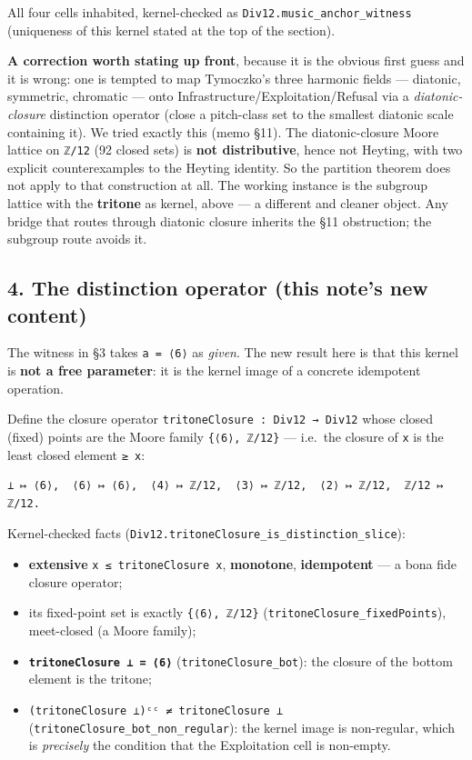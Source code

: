 \documentclass[
  11pt,
]{article}
\providecommand{\tightlist}{%
  \setlength{\itemsep}{0pt}\setlength{\parskip}{0pt}}
\begin{document}
All four cells inhabited, kernel-checked as
\texttt{Div12.music\_anchor\_witness} (uniqueness of this kernel stated
at the top of the section).

\textbf{A correction worth stating up front}, because it is the obvious
first guess and it is wrong: one is tempted to map Tymoczko's three
harmonic fields --- diatonic, symmetric, chromatic --- onto
Infrastructure/Exploitation/Refusal via a \emph{diatonic-closure}
distinction operator (close a pitch-class set to the smallest diatonic
scale containing it). We tried exactly this (memo §11). The
diatonic-closure Moore lattice on \texttt{ℤ/12} (92 closed sets) is
\textbf{not distributive}, hence not Heyting, with two explicit
counterexamples to the Heyting identity. So the partition theorem does
not apply to that construction at all. The working instance is the
subgroup lattice with the \textbf{tritone} as kernel, above --- a
different and cleaner object. Any bridge that routes through diatonic
closure inherits the §11 obstruction; the subgroup route avoids it.

\subsection{4. The distinction operator (this note's new
content)}\label{the-distinction-operator-this-notes-new-content}

The witness in §3 takes \texttt{a\ =\ ⟨6⟩} as \emph{given}. The new
result here is that this kernel is \textbf{not a free parameter}: it is
the kernel image of a concrete idempotent operation.

Define the closure operator \texttt{tritoneClosure\ :\ Div12\ →\ Div12}
whose closed (fixed) points are the Moore family \texttt{\{⟨6⟩,\ ℤ/12\}}
--- i.e.~the closure of \texttt{x} is the least closed element
\texttt{≥\ x}:

\begin{verbatim}
⊥ ↦ ⟨6⟩,  ⟨6⟩ ↦ ⟨6⟩,  ⟨4⟩ ↦ ℤ/12,  ⟨3⟩ ↦ ℤ/12,  ⟨2⟩ ↦ ℤ/12,  ℤ/12 ↦ ℤ/12.
\end{verbatim}

Kernel-checked facts
(\texttt{Div12.tritoneClosure\_is\_distinction\_slice}):

\begin{itemize}
\tightlist
\item
  \textbf{extensive} \texttt{x\ ≤\ tritoneClosure\ x},
  \textbf{monotone}, \textbf{idempotent} --- a bona fide closure
  operator;
\item
  its fixed-point set is exactly \texttt{\{⟨6⟩,\ ℤ/12\}}
  (\texttt{tritoneClosure\_fixedPoints}), meet-closed (a Moore family);
\item
  \textbf{\texttt{tritoneClosure\ ⊥\ =\ ⟨6⟩}}
  (\texttt{tritoneClosure\_bot}): the closure of the bottom element is
  the tritone;
\item
  \texttt{(tritoneClosure\ ⊥)ᶜᶜ\ ≠\ tritoneClosure\ ⊥}
  (\texttt{tritoneClosure\_bot\_non\_regular}): the kernel image is
  non-regular, which is \emph{precisely} the condition that the
  Exploitation cell is non-empty.
\end{itemize}
\end{document}
